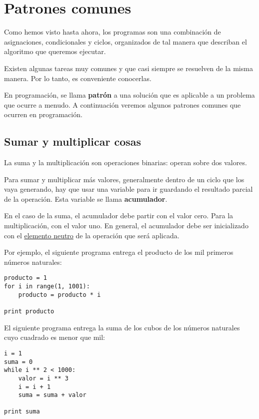 \section{Patrones comunes}

Como hemos visto hasta ahora, los programas son una combinación de
asignaciones, condicionales y ciclos, organizados de tal manera que
describan el algoritmo que queremos ejecutar.

Existen algunas tareas muy comunes y que casi siempre se resuelven de la
misma manera. Por lo tanto, es conveniente conocerlas.

En programación, se llama \textbf{patrón} a una solución que es
aplicable a un problema que ocurre a menudo. A continuación veremos
algunos patrones comunes que ocurren en programación.

\subsection{Sumar y multiplicar cosas}

La suma y la multiplicación son operaciones binarias: operan sobre dos
valores.

Para sumar y multiplicar más valores, generalmente dentro de un ciclo
que los vaya generando, hay que usar una variable para ir guardando el
resultado parcial de la operación. Esta variable se llama
\textbf{acumulador}.

En el caso de la suma, el acumulador debe partir con el valor cero. Para
la multiplicación, con el valor uno. En general, el acumulador debe ser
inicializado con el
\href{http://es.wikipedia.org/wiki/Elemento\_neutro}{elemento neutro} de
la operación que será aplicada.

Por ejemplo, el siguiente programa entrega el producto de los mil
primeros números naturales:

\begin{lstlisting}
producto = 1
for i in range(1, 1001):
    producto = producto * i

print producto
\end{lstlisting}

El siguiente programa entrega la suma de los cubos de los números
naturales cuyo cuadrado es menor que mil:

\begin{lstlisting}
i = 1
suma = 0
while i ** 2 < 1000:
    valor = i ** 3
    i = i + 1
    suma = suma + valor

print suma
\end{lstlisting}

